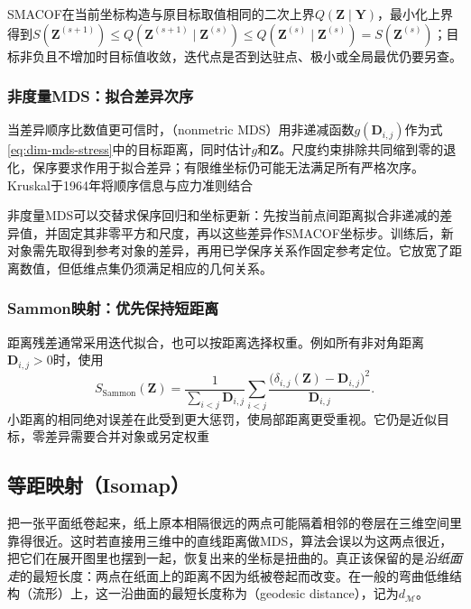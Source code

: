 SMACOF在当前坐标构造与原目标取值相同的二次上界$Q(\bm Z\mid\bm Y)$，最小化上界得到$S(\bm{Z}^{(s+1)})\leq Q(\bm{Z}^{(s+1)}\mid\bm{Z}^{(s)})\leq Q(\bm{Z}^{(s)}\mid\bm{Z}^{(s)})=S(\bm{Z}^{(s)})$；目标非负且不增加时目标值收敛，迭代点是否到达驻点、极小或全局最优仍要另查。

\subsubsection{非度量MDS：拟合差异次序}

当差异顺序比数值更可信时，（nonmetric MDS）用非递减函数$g(\bm{D}_{i,j})$作为式\eqref{eq:dim-mds-stress}中的目标距离，同时估计$g$和$\bm{Z}$。尺度约束排除共同缩到零的退化，保序要求作用于拟合差异；有限维坐标仍可能无法满足所有严格次序。Kruskal于1964年将顺序信息与应力准则结合

非度量MDS可以交替求保序回归和坐标更新：先按当前点间距离拟合非递减的差异值，并固定其非零平方和尺度，再以这些差异作SMACOF坐标步。训练后，新对象需先取得到参考对象的差异，再用已学保序关系作固定参考定位。它放宽了距离数值，但低维点集仍须满足相应的几何关系。

\subsubsection{Sammon映射：优先保持短距离}

距离残差通常采用迭代拟合，也可以按距离选择权重。例如所有非对角距离$\bm{D}_{i,j}>0$时，使用
\begin{equation}
  \label{eq:dim-sammon}
  S_{\mathrm{Sammon}}(\bm{Z})
  =\frac{1}{\sum_{i<j}\bm{D}_{i,j}}
    \sum_{i<j}
    \frac{\bigl(\delta_{i,j}(\bm{Z})-\bm{D}_{i,j}\bigr)^2}
         {\bm{D}_{i,j}}.
\end{equation}
小距离的相同绝对误差在此受到更大惩罚，使局部距离更受重视。它仍是近似目标，零差异需要合并对象或另定权重

\subsection{等距映射（Isomap）}
\label{sec:dim-isomap}

把一张平面纸卷起来，纸上原本相隔很远的两点可能隔着相邻的卷层在三维空间里靠得很近。这时若直接用三维中的直线距离做MDS，算法会误以为这两点很近，把它们在展开图里也摆到一起，恢复出来的坐标是扭曲的。真正该保留的是\emph{沿纸面走}的最短长度：两点在纸面上的距离不因为纸被卷起而改变。在一般的弯曲低维结构（流形）上，这一沿曲面的最短长度称为（geodesic distance），记为$d_{\mathcal{M}}$。

